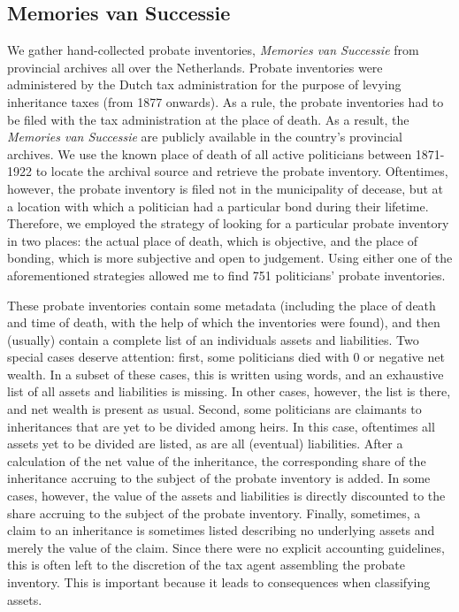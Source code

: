 \subsection{Memories van Successie}
We gather hand-collected probate inventories, \textit{Memories van Successie} from provincial archives all over the Netherlands. Probate inventories were administered by the Dutch tax administration for the purpose of levying inheritance taxes (from 1877 onwards). \autocite{bos1989memories} As a rule, the probate inventories had to be filed with the tax administration at the place of death. As a result, the \textit{Memories van Successie} are publicly available in the country's provincial archives. We use the known place of death of all active politicians between 1871-1922 to locate the archival source and retrieve the probate inventory. Oftentimes, however, the probate inventory is filed not in the municipality of decease, but at a location with which a politician had a particular bond during their lifetime. Therefore, we employed the strategy of looking for a particular probate inventory in two places: the actual place of death, which is objective, and the place of bonding, which is more subjective and open to judgement. Using either one of the aforementioned strategies allowed me to find 751 politicians' probate inventories. 

These probate inventories contain some metadata (including the place of death and time of death, with the help of which the inventories were found), and then (usually) contain a complete list of an individuals assets and liabilities. Two special cases deserve attention: first, some politicians died with 0 or negative net wealth. In a subset of these cases, this is written using words, and an exhaustive list of all assets and liabilities is missing. In other cases, however, the list is there, and net wealth is present as usual. Second, some politicians are claimants to inheritances that are yet to be divided among heirs. In this case, oftentimes all assets yet to be divided are listed, as are all (eventual) liabilities. After a calculation of the net value of the inheritance, the corresponding share of the inheritance accruing to the subject of the probate inventory is added. In some cases, however, the value of the assets and liabilities is directly discounted to the share accruing to the subject of the probate inventory. Finally, sometimes, a claim to an inheritance is sometimes listed describing no underlying assets and merely the value of the claim. Since there were no explicit accounting guidelines, this is often left to the discretion of the tax agent assembling the probate inventory. This is important because it leads to consequences when classifying assets. 

